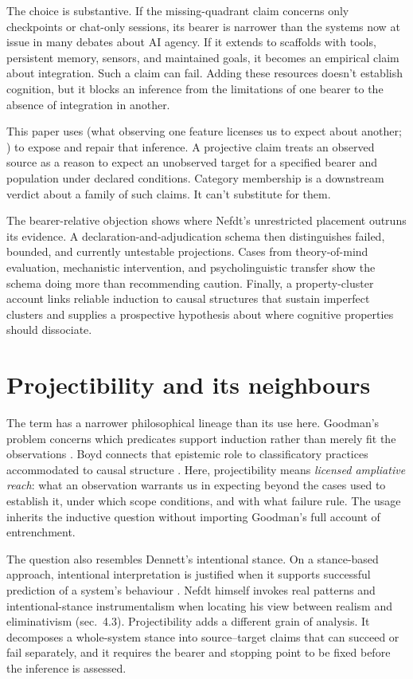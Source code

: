 \documentclass[12pt]{article}
\begin{document}
The choice is substantive. If the missing-quadrant claim concerns only checkpoints or chat-only sessions, its bearer is narrower than the systems now at issue in many debates about AI agency. If it extends to scaffolds with tools, persistent memory, sensors, and maintained goals, it becomes an empirical claim about integration. Such a claim can fail. Adding these resources doesn't establish cognition, but it blocks an inference from the limitations of one bearer to the absence of integration in another.

This paper uses  (what observing one feature licenses us to expect about another; \citealp{goodman1983}) to expose and repair that inference. A projective claim treats an observed source as a reason to expect an unobserved target for a specified bearer and population under declared conditions. Category membership is a downstream verdict about a family of such claims. It can't substitute for them.

The bearer-relative objection shows where Nefdt's unrestricted placement outruns its evidence. A declaration-and-adjudication schema then distinguishes failed, bounded, and currently untestable projections. Cases from theory-of-mind evaluation, mechanistic intervention, and psycholinguistic transfer show the schema doing more than recommending caution. Finally, a property-cluster account links reliable induction to causal structures that sustain imperfect clusters and supplies a prospective hypothesis about where cognitive properties should dissociate.

\section{Projectibility and its neighbours}

The term  has a narrower philosophical lineage than its use here. Goodman's problem concerns which predicates support induction rather than merely fit the observations \citep{goodman1983}. Boyd connects that epistemic role to classificatory practices accommodated to causal structure \citep{boyd1991,boyd1999}. Here, projectibility means \emph{licensed ampliative reach}: what an observation warrants us in expecting beyond the cases used to establish it, under which scope conditions, and with what failure rule. The usage inherits the inductive question without importing Goodman's full account of entrenchment.

The question also resembles Dennett's intentional stance. On a stance-based approach, intentional interpretation is justified when it supports successful prediction of a system's behaviour \citep{dennett1987IntentionalStance,dennett1991}. Nefdt himself invokes real patterns and intentional-stance instrumentalism when locating his view between realism and eliminativism (sec.~4.3). Projectibility adds a different grain of analysis. It decomposes a whole-system stance into source--target claims that can succeed or fail separately, and it requires the bearer and stopping point to be fixed before the inference is assessed.
\end{document}
